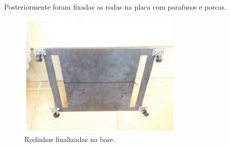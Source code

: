 Posteriormente foram fixadas as rodas na placa com parafusos e porcas.

\par
\begin{figure}[h]
  \centering
  \includegraphics[width=0.7\textwidth]{figures/rodinhas.png}
  \caption{Rodinhas finalizadas na base.}
  \label{fig:rodinhas}
\end{figure}
\FloatBarrier
\par
